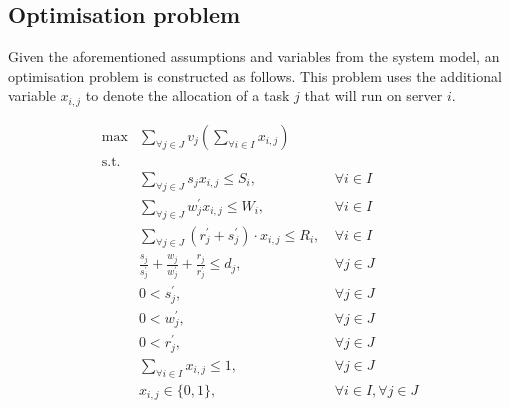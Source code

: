 \subsection{Optimisation problem}
\label{subsec:optimisation-problem}
Given the aforementioned assumptions and variables from the system model, an optimisation problem is constructed as
follows. This problem uses the additional variable $x_{i,j}$ to denote the allocation of a task $j$ that will run on
server $i$.

\begin{align}
    \max & \sum_{\forall j \in J} v_j \left(\sum_{\forall i \in I} x_{i,j}\right) \label{eq:objective} \\
    \mbox{s.t.} \nonumber \\
    & \sum_{\forall j \in J} s_j x_{i,j} \leq S_i, &~ \forall{i \in I} \label{eq:server-storage-constraint} \\
    & \sum_{\forall j \in J} w^{'}_j x_{i,j} \leq W_i, &~ \forall{i \in I} \label{eq:server-computation-constraint} \\
    & \sum_{\forall j \in J} (r^{'}_j + s^{'}_j) \cdot x_{i,j} \leq R_i, &~ \forall{i \in I} \label{eq:server-bandwidth-constraint} \\
    & \frac{s_j}{s^{'}_j} + \frac{w_j}{w^{'}_j} + \frac{r_j}{r^{'}_j} \leq d_j, &~ \forall{j \in J} \label{eq:task-deadline} \\
    & 0 < s^{'}_j, &~ \forall{j \in J} \label{eq:loading-speeds} \\
    & 0 < w^{'}_j, &~ \forall{j \in J} \label{eq:compute-speeds} \\
    & 0 < r^{'}_j, &~ \forall{j \in J} \label{eq:sending-speeds} \\
    & \sum_{\forall i \in I} x_{i,j} \leq 1, &~ \forall{j \in J} \label{eq:server-task-allocation} \\
    & x_{i,j} \in \{0, 1\}, &~ \forall{i \in I},\forall{j \in J} \label{eq:task-allocation}
\end{align}

